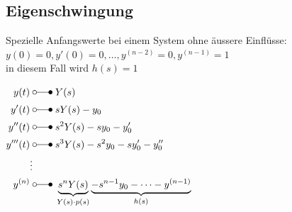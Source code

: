 		

				
		
	\subsection{Eigenschwingung }
		\begin{minipage}{12cm}
			Spezielle Anfangswerte bei einem System ohne äussere Einflüsse:\\
			$y(0) = 0, y'(0) = 0, \dots , y^{(n-2)} = 0, y^{(n-1)} = 1$\\
			in diesem Fall wird $h(s) = 1$\\
		\end{minipage}
		\begin{minipage}{6cm}
			\begin{math}
				\begin{aligned}
					y(t) \; &\laplace \; Y(s)\\
					y'(t) \; &\laplace \; sY(s) - y_0\\
					y''(t)\; &\laplace \; s^2Y(s) - sy_0 - y'_0\\ 
					y'''(t)\; &\laplace \; s^3Y(s) - s^2y_0 - sy'_0 - y''_0\\ 
					\vdots&\\
					y^{(n)} \; &\laplace \; 
					\underbrace{s^nY(s)}_{Y(s) \cdot p(s)}
					\underbrace{-s^{n-1}y_0 - \dots - y^{(n-1)}}_{h(s)}
				\end{aligned}
			\end{math}
		\end{minipage}